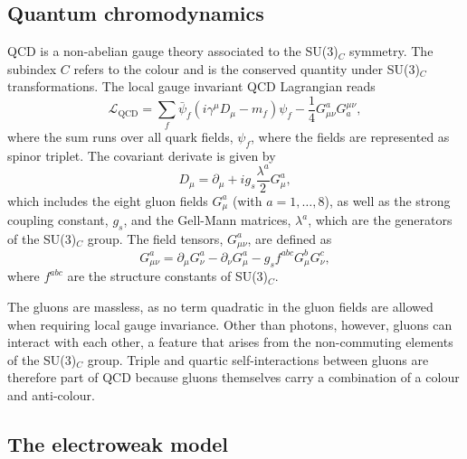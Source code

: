 \subsection{Quantum chromodynamics}
QCD is a non-abelian gauge theory associated to the SU(3)$_C$ symmetry. The subindex $C$ refers to the colour and is the conserved quantity under SU(3)$_C$ transformations.
The local gauge invariant QCD Lagrangian reads
\begin{equation}
  \mathcal{L}_{\text{QCD}} = \sum_f \bar{\psi}_f(i\gamma^\mu D_\mu - m_f)\psi_f - \frac{1}{4}G_{\mu\nu}^aG^{\mu\nu}_{a},  \label{eq:lqcd}
\end{equation}
where the sum runs over all quark fields, $\psi_f$, where the fields are represented as spinor triplet. 
The covariant derivate is given by
\begin{equation}
    D_\mu = \partial_\mu + i g_s \frac{\lambda^a}{2} G_\mu^a,
\end{equation}
which includes the eight gluon fields $G_\mu^a$ (with $a = 1, \ldots, 8$), as well as the strong coupling constant, $g_s$, and the Gell-Mann matrices, $\lambda^a$, which are the generators of the SU(3)$_C$ group.
The field tensors, $G_{\mu\nu}^a$, are defined as
\begin{equation}
  \label{eq:qcd-tensor}
  G_{\mu\nu}^a = \partial_\mu G_\nu^a - \partial_\nu G_\mu^a - g_s f^{abc}G_\mu^b G_\nu^c,
\end{equation}
where $f^{abc}$ are the structure constants of SU(3)$_C$. 

The gluons are massless, as no term quadratic in the gluon fields are allowed when requiring local gauge invariance. Other than photons, however, gluons can interact with each other, a feature that arises from the non-commuting elements of the SU(3)$_C$ group. Triple and quartic self-interactions between gluons are therefore part of QCD because gluons themselves carry a combination of a colour and anti-colour. 



\subsection{The electroweak model}



